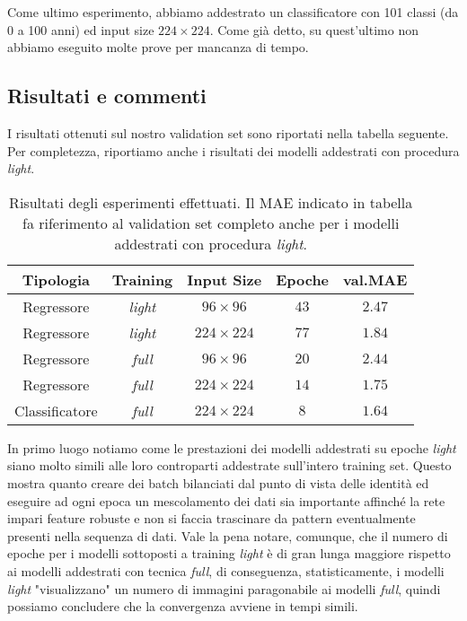Come ultimo esperimento, abbiamo addestrato un classificatore con 101 classi (da 0 a 100 anni) ed input size $224 \times 224$. Come già detto, su quest'ultimo non abbiamo eseguito molte prove per mancanza di tempo.

\subsection{Risultati e commenti}

I risultati ottenuti sul nostro validation set sono riportati nella tabella seguente. Per completezza, riportiamo anche i risultati dei modelli addestrati con procedura \emph{light}. 

\begin{table}[ht]
    \centering
    \begin{tabular}{ |c|c|c|c|c| } 
        \hline
        \textbf{Tipologia} & \textbf{Training} & \textbf{Input Size} & \textbf{Epoche} & \textbf{val.\@ MAE} \\
        \hline
        Regressore & \emph{light} & $96 \times 96$  & $43$ & $2.47$ \\
        \hline
        Regressore & \emph{light} & $224 \times 224$ & $77$ & $1.84$ \\
        \hline
        Regressore & \emph{full} & $96 \times 96$ & $20$ & $2.44$ \\
        \hline
        Regressore & \emph{full} & $224 \times 224$ & $14$ & $1.75$ \\
        \hline   
        Classificatore & \emph{full} & $224 \times 224$ & $8$ & $1.64$ \\
        \hline
    \end{tabular}
    \caption{Risultati degli esperimenti effettuati. Il MAE indicato in tabella fa riferimento al validation set completo anche per i modelli addestrati con procedura \emph{light}.}
\end{table}

In primo luogo notiamo come le prestazioni dei modelli addestrati su epoche \emph{light} siano molto simili alle loro controparti addestrate sull'intero training set. Questo mostra quanto creare dei batch bilanciati dal punto di vista delle identità ed eseguire ad ogni epoca un mescolamento dei dati sia importante affinché la rete impari feature robuste e non si faccia trascinare da pattern eventualmente presenti nella sequenza di dati. Vale la pena notare, comunque, che il numero di epoche per i modelli sottoposti a training \emph{light} è di gran lunga maggiore rispetto ai modelli addestrati con tecnica \emph{full}, di conseguenza, statisticamente, i modelli \emph{light} "visualizzano" un numero di immagini paragonabile ai modelli \emph{full}, quindi possiamo concludere che la convergenza avviene in tempi simili.

